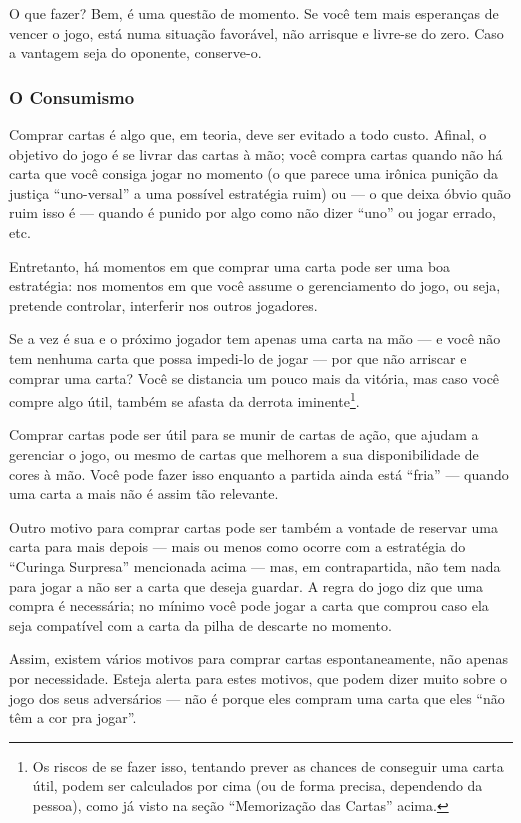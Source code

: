 O que fazer? Bem, é uma questão de momento. Se você tem mais esperanças de vencer o jogo, está numa situação favorável, não arrisque e livre-se do zero. Caso a vantagem seja do oponente, conserve-o.

\subsubsection{O Consumismo}

Comprar cartas é algo que, em teoria, deve ser evitado a todo custo. Afinal, o objetivo do jogo é se livrar das cartas à mão; você compra cartas quando não há carta que você consiga jogar no momento (o que parece uma irônica punição da justiça ``uno-versal'' a uma possível estratégia ruim) ou --- o que deixa óbvio quão ruim isso é --- quando é punido por algo como não dizer ``uno'' ou jogar errado, etc.

Entretanto, há momentos em que comprar uma carta pode ser uma boa estratégia: nos momentos em que você assume o gerenciamento do jogo, ou seja, pretende controlar, interferir nos outros jogadores.

Se a vez é sua e o próximo jogador tem apenas uma carta na mão --- e você não tem nenhuma carta que possa impedi-lo de jogar --- por que não arriscar e comprar uma carta? Você se distancia um pouco mais da vitória, mas caso você compre algo útil, também se afasta da derrota iminente\footnote{Os riscos de se fazer isso, tentando prever as chances de conseguir uma carta útil, podem ser calculados por cima (ou de forma precisa, dependendo da pessoa), como já visto na seção ``Memorização das Cartas'' acima.}.

Comprar cartas pode ser útil para se munir de cartas de ação, que ajudam a gerenciar o jogo, ou mesmo de cartas que melhorem a sua disponibilidade de cores à mão. Você pode fazer isso enquanto a partida ainda está ``fria'' --- quando uma carta a mais não é assim tão relevante.

Outro motivo para comprar cartas pode ser também a vontade de reservar uma carta para mais depois --- mais ou menos como ocorre com a estratégia do ``Curinga Surpresa'' mencionada acima --- mas, em contrapartida, não tem nada para jogar a não ser a carta que deseja guardar. A regra do jogo diz que uma compra é necessária; no mínimo você pode jogar a carta que comprou caso ela seja compatível com a carta da pilha de descarte no momento.

Assim, existem vários motivos para comprar cartas espontaneamente, não apenas por necessidade. Esteja alerta para estes motivos, que podem dizer muito sobre o jogo dos seus adversários --- não é porque eles compram uma carta que eles ``não têm a cor pra jogar''.


